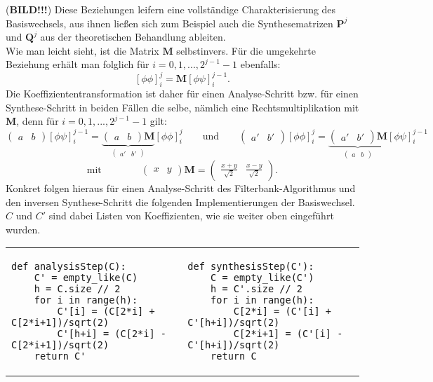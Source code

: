 %
(\textbf{BILD!!!}) Diese Beziehungen leifern eine vollständige Charakterisierung des Basiswechsels, aus ihnen ließen sich zum Beispiel auch die Synthesematrizen $\mathbf{P}^j$ und $\mathbf{Q}^j$ aus der theoretischen Behandlung ableiten.\\
Wie man leicht sieht, ist die Matrix $\mathbf{M}$ selbstinvers. Für die umgekehrte Beziehung erhält man folglich für $i = 0, 1, ..., 2^{j-1}-1$ ebenfalls:
%
\[
\left[ \phi\phi \right]_{i}^j
=
\mathbf{M}
\left[ \phi\psi \right]_{i}^{j-1}
.
\]
%
Die Koeffiziententransformation ist daher für einen Analyse-Schritt bzw. für einen Synthese-Schritt in beiden Fällen die selbe, nämlich eine Rechtsmultiplikation mit $\mathbf{M}$, denn für $i = 0, 1, ..., 2^{j-1}-1$ gilt:
%
\[
\begin{pmatrix}
a & b
\end{pmatrix}
\left[ \phi\psi \right]_{i}^{j-1}
=
\underbrace{
\begin{pmatrix}
a & b
\end{pmatrix}
\mathbf{M}
}_{
\begin{pmatrix}
a' & b'
\end{pmatrix}
}
\left[ \phi\phi \right]_{i}^j
\qquad \mbox{und} \qquad
\begin{pmatrix}
a' & b'
\end{pmatrix}
\left[ \phi\phi \right]_{i}^j
=
\underbrace{
\begin{pmatrix}
a' & b'
\end{pmatrix}
\mathbf{M}
}_{
\begin{pmatrix}
a & b
\end{pmatrix}
}
\left[ \phi\psi \right]_{i}^{j-1}
\]
%
\[
\mbox{mit} \qquad \qquad
\begin{pmatrix}
x & y
\end{pmatrix}
\mathbf{M}
=
\begin{pmatrix}
\frac{x+y}{\sqrt{2}} & \frac{x-y}{\sqrt{2}}
\end{pmatrix}
.
\]
%
Konkret folgen hieraus für einen Analyse-Schritt des Filterbank-Algorithmus und den inversen Synthese-Schritt die folgenden Implementierungen der Basiswechsel. $C$ und $C'$ sind dabei Listen von Koeffizienten, wie sie weiter oben eingeführt wurden.

\begin{adjustbox}{max width=\textwidth ,center}
\begin{tabular}{p{}|p{}}
\begin{verbatim}
def analysisStep(C):
    C' = empty_like(C)
    h = C.size // 2
    for i in range(h):
        C'[i] = (C[2*i] + C[2*i+1])/sqrt(2)
        C'[h+i] = (C[2*i] - C[2*i+1])/sqrt(2)
    return C'
\end{verbatim}
&
\begin{verbatim}
def synthesisStep(C'):
    C = empty_like(C')
    h = C'.size // 2
    for i in range(h):
        C[2*i] = (C'[i] + C'[h+i])/sqrt(2)
        C[2*i+1] = (C'[i] - C'[h+i])/sqrt(2)
    return C
\end{verbatim}
\\
\end{tabular}
\end{adjustbox}

